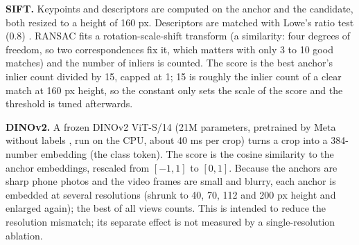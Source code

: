 \documentclass[11pt,a4paper]{article}
\begin{document}
\textbf{SIFT.} Keypoints and descriptors are computed on the anchor and the candidate, both resized to a height of 160 px. Descriptors are matched with
Lowe's ratio test (0.8) \cite{lowe2004}. RANSAC \cite{fischler1981} fits a rotation-scale-shift transform (a similarity: four degrees of freedom, so two correspondences fix it, which matters with only 3 to 10 good matches) and the number of inliers is counted.
The score is the best anchor's inlier count divided by 15, capped at 1; 15 is roughly the inlier count of a clear match at 160 px height, so the constant only sets the scale of the score and the threshold is tuned afterwards.

\textbf{DINOv2.} A frozen DINOv2 ViT-S/14 (21M parameters, pretrained by Meta without labels \cite{oquab2023}, run on the CPU, about 40 ms per crop) turns a crop into a
384-number embedding (the class token). The score is the cosine similarity to the anchor embeddings, rescaled from $[-1,1]$ to $[0,1]$.
Because the anchors are sharp phone photos and the video frames are small and blurry, each anchor is embedded at several resolutions
(shrunk to 40, 70, 112 and 200 px height and enlarged again); the best of all views counts. This is intended to reduce the resolution mismatch; its separate effect is not measured by a single-resolution ablation.
\end{document}
